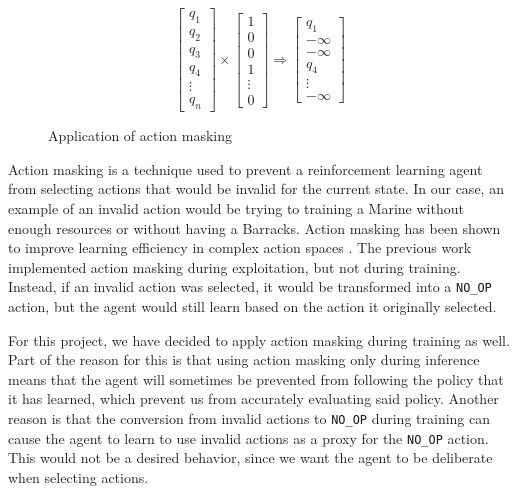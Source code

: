 \begin{figure}[t]
    \begin{equation*}
        \begin{bmatrix}
        q_1 \\ q_2 \\ q_3 \\ q_4 \\ \vdots \\ q_n
        \end{bmatrix}
        \times 
        \begin{bmatrix}
        1 \\ 0 \\ 0 \\ 1 \\ \vdots \\ 0
        \end{bmatrix}
        \Rightarrow 
        \begin{bmatrix}
        q_1 \\ -\infty \\ -\infty \\ q_4 \\ \vdots \\ -\infty
        \end{bmatrix}
    \end{equation*}
\caption{Application of action masking}
\label{fig:action_masking}
\end{figure}

Action masking is a technique used to prevent a reinforcement learning agent from selecting actions that would be invalid for the current state. In our case, an example of an invalid action would be trying to training a Marine without enough resources or without having a Barracks. Action masking has been shown to improve learning efficiency in complex action spaces \cite{Huang:2022}. The previous work implemented action masking during exploitation, but not during training. Instead, if an invalid action was selected, it would be transformed into a \texttt{NO\_OP} action, but the agent would still learn based on the action it originally selected.

For this project, we have decided to apply action masking during training as well. Part of the reason for this is that using action masking only during inference means that the agent will sometimes be prevented from following the policy that it has learned, which prevent us from accurately evaluating said policy. Another reason is that the conversion from invalid actions to \texttt{NO\_OP} during training can cause the agent to learn to use invalid actions as a proxy for the \texttt{NO\_OP} action. This would not be a desired behavior, since we want the agent to be deliberate when selecting actions.

